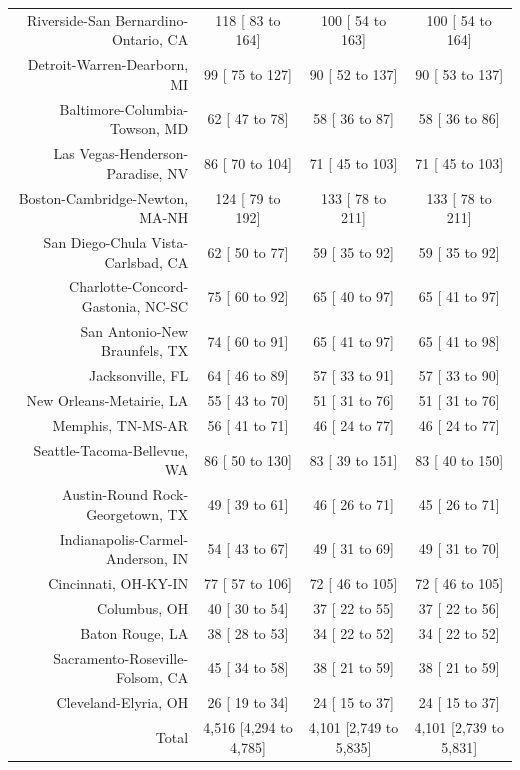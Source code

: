 \documentclass{article}
\begin{document}
\begin{table}[H]
\begin{tabular}{|r|c|c|c|}
		Riverside-San Bernardino-Ontario, CA &   118 [   83 to   164] &   100 [   54 to   163] &   100 [   54 to   164]\\
		Detroit-Warren-Dearborn, MI &    99 [   75 to   127] &    90 [   52 to   137] &    90 [   53 to   137]\\
		Baltimore-Columbia-Towson, MD &    62 [   47 to    78] &    58 [   36 to    87] &    58 [   36 to    86]\\
		Las Vegas-Henderson-Paradise, NV &    86 [   70 to   104] &    71 [   45 to   103] &    71 [   45 to   103]\\
		Boston-Cambridge-Newton, MA-NH &   124 [   79 to   192] &   133 [   78 to   211] &   133 [   78 to   211]\\
		San Diego-Chula Vista-Carlsbad, CA &    62 [   50 to    77] &    59 [   35 to    92] &    59 [   35 to    92]\\
		Charlotte-Concord-Gastonia, NC-SC &    75 [   60 to    92] &    65 [   40 to    97] &    65 [   41 to    97]\\
		San Antonio-New Braunfels, TX &    74 [   60 to    91] &    65 [   41 to    97] &    65 [   41 to    98]\\
		Jacksonville, FL &    64 [   46 to    89] &    57 [   33 to    91] &    57 [   33 to    90]\\
		New Orleans-Metairie, LA &    55 [   43 to    70] &    51 [   31 to    76] &    51 [   31 to    76]\\
		Memphis, TN-MS-AR &    56 [   41 to    71] &    46 [   24 to    77] &    46 [   24 to    77]\\
		Seattle-Tacoma-Bellevue, WA &    86 [   50 to   130] &    83 [   39 to   151] &    83 [   40 to   150]\\
		Austin-Round Rock-Georgetown, TX &    49 [   39 to    61] &    46 [   26 to    71] &    45 [   26 to    71]\\
		Indianapolis-Carmel-Anderson, IN &    54 [   43 to    67] &    49 [   31 to    69] &    49 [   31 to    70]\\
		Cincinnati, OH-KY-IN &    77 [   57 to   106] &    72 [   46 to   105] &    72 [   46 to   105]\\
		Columbus, OH &    40 [   30 to    54] &    37 [   22 to    55] &    37 [   22 to    56]\\
		Baton Rouge, LA &    38 [   28 to    53] &    34 [   22 to    52] &    34 [   22 to    52]\\
		Sacramento-Roseville-Folsom, CA &    45 [   34 to    58] &    38 [   21 to    59] &    38 [   21 to    59]\\
		Cleveland-Elyria, OH &    26 [   19 to    34] &    24 [   15 to    37] &    24 [   15 to    37]\\
		\hline
		Total & 4,516 [4,294 to 4,785] & 4,101 [2,749 to 5,835] & 4,101 [2,739 to 5,831]\\
		\hline
	\end{tabular}
\end{table}
\end{document}
